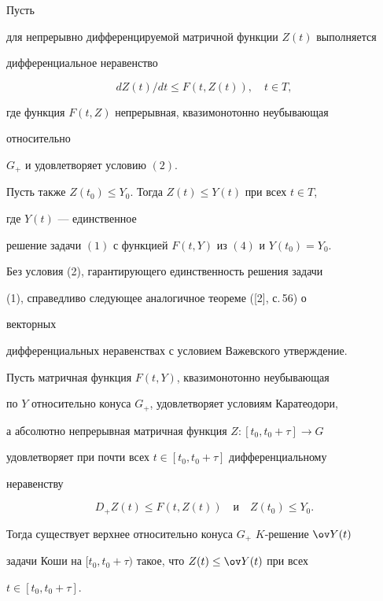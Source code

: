  


\begin{thm} 


Пусть 


для непрерывно дифференцируемой матричной функции $Z(t)$ выполняется 


дифференциальное неравенство 


\begin{equation} 


d Z(t)/d t\le F(t,Z(t)),\quad t\in T, 


\end{equation} 


где функция $F(t,Z)$ непрерывная, квазимонотонно неубывающая 


относительно 


$G_+$ и удовлетворяет условию $(2)$. 


Пусть также $Z(t_0)\le Y_0$. Тогда $Z(t)\le Y(t)$ при всех $t\in T$, 


где $Y(t)$ --- единственное 


решение задачи $(1)$ с функцией $F(t,Y)$ из $(4)$ и $Y(t_0)=Y_0$. 


\end{thm} 


 


Без условия (2), гарантирующего единственность решения задачи 


(1), справедливо следующее аналогичное теореме ([2], с.\,56) о 


векторных 


дифференциальных неравенствах с условием Важевского утверждение. 


 


\begin{thm} 


Пусть матричная функция $F(t,Y)$, квазимонотонно неубывающая 


по $Y$ относительно конуса $G_+$, удовлетворяет условиям Каратеодори, 


а абсолютно непрерывная матричная функция $Z:[t_0,t_0+\tau]\to G$ 


удовлетворяет при почти всех $t\in[t_0,t_0+\tau]$ дифференциальному 


неравенству 


$$ 


D_+Z(t)\le F(t,Z(t))\quad 


\text{и} 


\quad Z(t_0)\le Y_0. 


$$ 


Тогда существует верхнее относительно конуса $G_+$\; $K$-решение $\ov 


Y(t)$ 


задачи Коши на $[t_0,t_0+\tau)$ такое, что $Z(t)\le\ov Y(t)$ при всех 


$t\in[t_0,t_0+\tau]$. 


\end{thm} 


